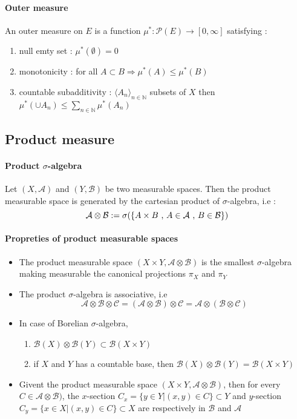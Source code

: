 \documentclass[a4paper,10pt]{article}
\begin{document}
\paragraph{Outer measure}
An outer measure on $E$ is a function $\mu^{*} : \mathcal{P}(E) \longrightarrow [0,\infty]$ satisfying :
\begin{enumerate}
 \item null emty set : $\mu^{*}(\emptyset) = 0$
 \item monotonicity : for all $A \subset B \Longrightarrow \mu^{*}(A) \leq \mu^{*}(B)$  
 \item countable subadditivity : $\langle A_{n} \rangle_{n \in \mathbb{N}}$ subsets of $X$ then $\mu^{*}(\cup A_{n}) \leq \sum_{n \in \mathbb{N}}\mu^{*}(A_n) $
\end{enumerate}


\subsection{Product measure}
\paragraph{Product $\sigma$-algebra} Let $(X,\mathcal{A})$ and $(Y,\mathcal{B})$ be two measurable spaces. Then the product measurable space is generated by the cartesian product of $\sigma$-algebra, i.e :
\[
\mathcal{A} \otimes \mathcal{B} := \sigma (\{A \times B \hbox{ , } A \in \mathcal{A} \hbox{ , }  B \in \mathcal{B} \})
\]
\paragraph{Propreties of product measurable spaces}
\begin{itemize}
\renewcommand{\labelitemi}{$\vcenter{\hbox{\tiny$\bullet$}}$}
 \item The product measurable space $(X\times Y, \mathcal{A}\otimes\mathcal{B})$ is the smallest $\sigma$-algebra making measurable the canonical projections $\pi_{X}$ and $\pi_{Y}$
 \item The product $\sigma$-algebra is associative, i.e 
  \[
    \mathcal{A} \otimes \mathcal{B} \otimes \mathcal{C} = (\mathcal{A} \otimes \mathcal{B}) \otimes \mathcal{C} = \mathcal{A} \otimes( \mathcal{B} \otimes \mathcal{C})
  \]
  \item In case of Borelian $\sigma$-algebra,
  \begin{enumerate}[i]
   \item $\mathcal{B}(X) \otimes \mathcal{B}(Y) \subset \mathcal{B}(X\times Y)$
   \item if $X$ and $Y$ has a countable base, then $\mathcal{B}(X) \otimes \mathcal{B}(Y) = \mathcal{B}(X\times Y)$
  \end{enumerate}
  \item Givent the product measurable space $(X\times Y, \mathcal{A}\otimes\mathcal{B})$, then for every $C \in \mathcal{A}\otimes\mathcal{B})$, the $x$-section $C_x=\{y\in Y | (x,y) \in C \} \subset Y$  and $y$-section $C_y=\{x\in X | (x,y) \in C \} \subset X$ are respectively in $\mathcal{B}$ and $\mathcal{A}$
\end{itemize}
\end{document}
